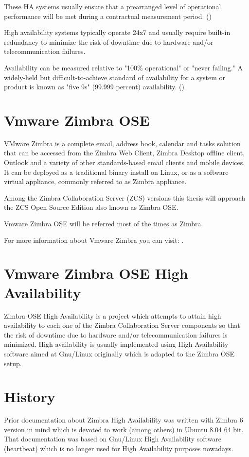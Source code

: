 These HA systems usually ensure that a prearranged level of operational performance will be met during a contractual measurement period. (\cite{WikipediaHA})

High availability systems typically operate 24x7 and usually require built-in redundancy to minimize the risk of downtime due to hardware and/or telecommunication failures. 

Availability can be measured relative to "100\% operational" or "never failing." A widely-held but difficult-to-achieve standard of availability for a system or product is known as "five 9s" (99.999 percent) availability. (\cite{BCMHA})


\section {Vmware Zimbra OSE}
VMware Zimbra is a complete email, address book, calendar and tasks solution that can be accessed from the Zimbra Web Client, Zimbra Desktop offline client, Outlook and a variety of other standards-based email clients and mobile devices. It can be deployed as a traditional binary install on Linux, or as a software virtual appliance, commonly referred to as Zimbra appliance.

Among the Zimbra Collaboration Server (ZCS) versions this thesis will approach the ZCS Open Source Edition also known as Zimbra OSE.

Vmware Zimbra OSE will be referred most of the times as Zimbra.

For more information about Vmware Zimbra you can visit: \cite{ZimbraLearn}.

\section {Vmware Zimbra OSE High Availability}
Zimbra OSE High Availability is a project which attempts to attain high availability to each one of the Zimbra Collaboration Server components so that the risk of downtime due to hardware and/or telecommunication failures is minimized. High availability is usually implemented using High Availability software aimed at Gnu/Linux originally which is adapted to the Zimbra OSE setup.


\section{\label{sec:history}History}

Prior documentation about Zimbra High Availability was written with Zimbra 6 version in mind which is devoted to work (among others) in Ubuntu 8.04 64 bit. That documentation was based on Gnu/Linux High Availability software (heartbeat) which is no longer used for High Availability purposes nowadays.

